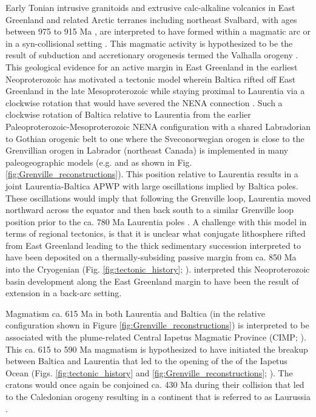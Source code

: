 \documentclass[twocolumn, switch]{article} %
\begin{document}
Early Tonian intrusive granitoids and extrusive calc-alkaline volcanics in East Greenland and related Arctic terranes including northeast Svalbard, with ages between 975 to 915 Ma \citep{McClelland2019a}, are interpreted to have formed within a magmatic arc or in a syn-collisional setting \citep{Johansson1999a}. This magmatic activity is hypothesized to be the result of subduction and accretionary orogenesis termed the Valhalla orogeny \citep{Cawood2010a}. This geological evidence for an active margin in East Greenland in the earliest Neoproterozoic has motivated a tectonic model wherein Baltica rifted off East Greenland in the late Mesoproterozoic while staying proximal to Laurentia via a clockwise rotation that would have severed the NENA connection \citep{Cawood2010a}. Such a clockwise rotation of Baltica relative to Laurentia from the earlier Paleoproterozoic-Mesoproterozoic NENA configuration with a shared Labradorian to Gothian orogenic belt to one where the Sveconorwegian orogen is close to the Grenvillian orogen in Labrador (northeast Canada) is implemented in many paleogeographic models (e.g. \citealp{Evans2009a} and as shown in Fig. \ref{fig:Grenville_reconstructions}). This position relative to Laurentia results in a joint Laurentia-Baltica APWP with large oscillations implied by Baltica poles. These oscillations would imply that following the Grenville loop, Laurentia moved northward across the equator and then back south to a similar Grenville loop position prior to the ca. 780 Ma Laurentia poles \citep{Evans2015a,Fairchild2017a}.  A challenge with this model in terms of regional tectonics, is that it is unclear what conjugate lithosphere rifted from East Greenland leading to the thick sedimentary succession interpreted to have been deposited on a thermally-subsiding passive margin from ca. 850 Ma into the Cryogenian (Fig. \ref{fig:tectonic_history}; \citealp{Maloof2006a}). \cite{Malone2014a} interpreted this Neoproterozoic basin development along the East Greenland margin to have been the result of extension in a back-arc setting. 

Magmatism ca. 615 Ma in both Laurentia and Baltica (in the relative configuration shown in Figure \ref{fig:Grenville_reconstructions}) is interpreted to be associated with the plume-related Central Iapetus Magmatic Province (CIMP; \citealp{Tegner2019a}). This ca. 615 to 590 Ma magmatism is hypothesized to have initiated the breakup between Baltica and Laurentia that led to the opening of the of the Iapetus Ocean (Figs. \ref{fig:tectonic_history} and \ref{fig:Grenville_reconstructions}; \citealp{Cawood2001a, Tegner2019a}). The cratons would once again be conjoined ca. 430 Ma during their collision that led to the Caledonian orogeny resulting in a continent that is referred to as Laurussia \citep{Torsvik2017a}.
\end{document}
